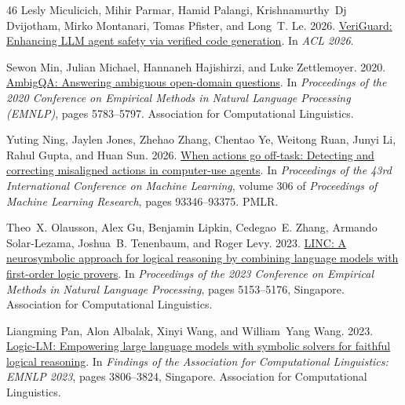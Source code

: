 \documentclass[11pt]{article}
\begin{document}
\begin{thebibliography}{46}
Lesly Miculicich, Mihir Parmar, Hamid Palangi, Krishnamurthy~Dj Dvijotham, Mirko Montanari, Tomas Pfister, and Long~T. Le. 2026.
\newblock \href {https://research.google/pubs/veriguard-enhancing-llm-agent-safety-via-verified-code-generation-2/} {{VeriGuard}: Enhancing {LLM} agent safety via verified code generation}.
\newblock In \emph{ACL 2026}.

Sewon Min, Julian Michael, Hannaneh Hajishirzi, and Luke Zettlemoyer. 2020.
\newblock \href {https://doi.org/10.18653/v1/2020.emnlp-main.466} {{AmbigQA}: Answering ambiguous open-domain questions}.
\newblock In \emph{Proceedings of the 2020 Conference on Empirical Methods in Natural Language Processing (EMNLP)}, pages 5783--5797. Association for Computational Linguistics.

Yuting Ning, Jaylen Jones, Zhehao Zhang, Chentao Ye, Weitong Ruan, Junyi Li, Rahul Gupta, and Huan Sun. 2026.
\newblock \href {https://proceedings.mlr.press/v306/ning26c.html} {When actions go off-task: Detecting and correcting misaligned actions in computer-use agents}.
\newblock In \emph{Proceedings of the 43rd International Conference on Machine Learning}, volume 306 of \emph{Proceedings of Machine Learning Research}, pages 93346--93375. PMLR.

Theo~X. Olausson, Alex Gu, Benjamin Lipkin, Cedegao~E. Zhang, Armando Solar-Lezama, Joshua~B. Tenenbaum, and Roger Levy. 2023.
\newblock \href {https://doi.org/10.18653/v1/2023.emnlp-main.313} {{LINC}: A neurosymbolic approach for logical reasoning by combining language models with first-order logic provers}.
\newblock In \emph{Proceedings of the 2023 Conference on Empirical Methods in Natural Language Processing}, pages 5153--5176, Singapore. Association for Computational Linguistics.

Liangming Pan, Alon Albalak, Xinyi Wang, and William~Yang Wang. 2023.
\newblock \href {https://doi.org/10.18653/v1/2023.findings-emnlp.248} {Logic-{LM}: Empowering large language models with symbolic solvers for faithful logical reasoning}.
\newblock In \emph{Findings of the Association for Computational Linguistics: EMNLP 2023}, pages 3806--3824, Singapore. Association for Computational Linguistics.


\end{thebibliography}
\end{document}
